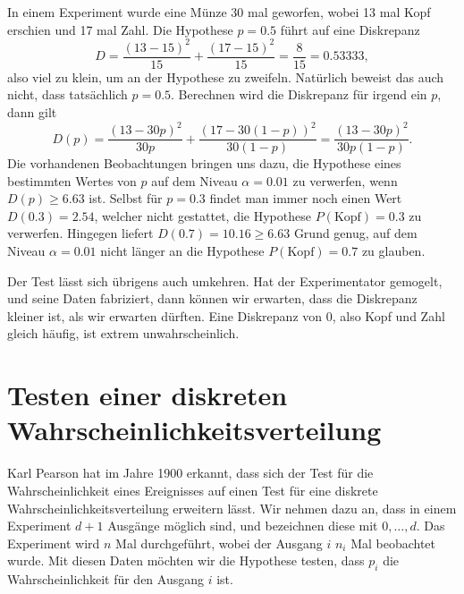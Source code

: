 In einem Experiment wurde eine Münze 30 mal geworfen, wobei 13 mal
Kopf erschien und 17 mal Zahl.
Die Hypothese $p=0.5$ führt auf eine
Diskrepanz 
\[
D=\frac{(13-15)^2}{15}+\frac{(17-15)^2}{15}=\frac{8}{15}=0.53333,
\]
also viel zu klein, um an der Hypothese zu zweifeln.
Natürlich beweist das auch nicht, dass tatsächlich $p=0.5$.
Berechnen wird die Diskrepanz für irgend ein $p$, dann gilt
\[
D(p)=\frac{(13-30p)^2}{30p}+\frac{(17-30(1-p))^2}{30(1-p)}
=\frac{(13-30p)^2}{30p(1-p)}.
\]
Die vorhandenen Beobachtungen bringen uns dazu, die Hypothese eines
bestimmten Wertes von $p$ auf dem Niveau $\alpha=0.01$ zu verwerfen,
wenn $D(p)\ge 6.63$ ist.
Selbst für $p=0.3$ findet man immer noch einen
Wert $D(0.3)=2.54$, welcher nicht gestattet,
die Hypothese $P(\text{Kopf})=0.3$ zu verwerfen.
Hingegen liefert 
$D(0.7)=10.16\ge 6.63$ Grund genug, auf dem Niveau $\alpha=0.01$ nicht
länger an die Hypothese $P(\text{Kopf})=0.7$ zu glauben.

Der Test lässt sich übrigens auch umkehren.
Hat der Experimentator
gemogelt, und seine Daten fabriziert, dann können wir erwarten, dass
die Diskrepanz kleiner ist, als wir erwarten dürften.
Eine Diskrepanz
von $0$, also Kopf und Zahl gleich häufig, ist extrem unwahrscheinlich.

\section{Testen einer diskreten Wahrscheinlichkeitsverteilung}
\label{section-testen-diskreter-wkeitsverteilung}
Karl Pearson hat im Jahre 1900 erkannt, dass sich der Test für die
Wahrscheinlichkeit eines Ereignisses auf einen Test für eine
diskrete Wahrscheinlichkeitsverteilung erweitern lässt.
Wir nehmen
dazu an, dass in einem Experiment $d+1$ Ausgänge möglich sind, und
bezeichnen diese mit $0,\dots,d$.
Das Experiment wird $n$ Mal
durchgeführt, wobei der Ausgang $i$ $n_i$ Mal beobachtet wurde.
Mit diesen Daten möchten wir die Hypothese testen, dass $p_i$ die
Wahrscheinlichkeit für den Ausgang $i$ ist.

